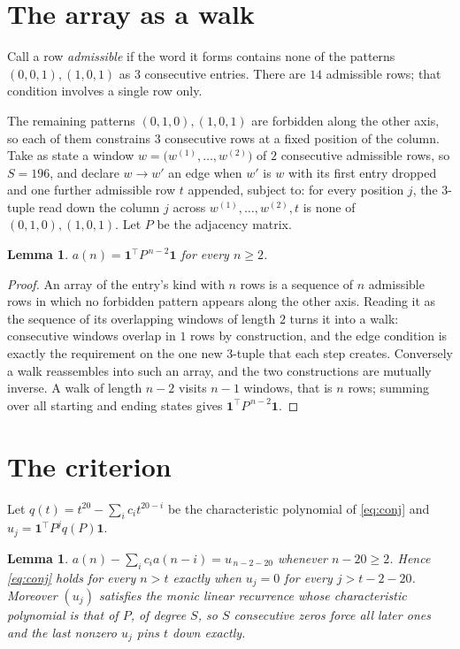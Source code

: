 \documentclass[11pt,a4paper]{article}
\theoremstyle{plain}
\newtheorem{lemma}[theorem]{Lemma}
\theoremstyle{definition}
\begin{document}
\section{The array as a walk}

Call a row \emph{admissible} if the word it forms contains none of the patterns
$(0,0,1), (1,0,1)$ as $3$ consecutive entries. There are $14$ admissible rows; that condition
involves a single row only.

The remaining patterns $(0,1,0), (1,0,1)$ are forbidden along the other axis, so each of them
constrains $3$ consecutive rows at a fixed position of the column. Take as state a
window $w=\bigl(w^{(1)},\dots,w^{(2)}\bigr)$ of $2$ consecutive admissible
rows, so $S=196$, and declare $w\to w'$ an edge when $w'$ is $w$ with its first entry
dropped and one further admissible row $t$ appended, subject to: for every position
$j$, the $3$-tuple read down the column $j$ across $w^{(1)},\dots,w^{(2)},t$
is none of $(0,1,0), (1,0,1)$. Let $P$ be the adjacency matrix.

\begin{lemma}\label{lem:walk}
$a(n)=\mathbf{1}^{\!\top}P^{\,n-2}\mathbf{1}$ for every $n\ge2$.
\end{lemma}

\begin{proof}
An array of the entry's kind with $n$ rows is a sequence of $n$ admissible rows in
which no forbidden pattern appears along the other axis. Reading it as the sequence of its
overlapping windows of length $2$ turns it into a walk: consecutive windows overlap in
$1$ rows by construction, and the edge condition is exactly the requirement on the one
new $3$-tuple that each step creates. Conversely a walk reassembles into such an array,
and the two constructions are mutually inverse. A walk of length $n-2$ visits $n-1$
windows, that is $n$ rows; summing over all starting and ending states gives
$\mathbf{1}^{\!\top}P^{\,n-2}\mathbf{1}$.
\end{proof}

\section{The criterion}

Let $q(t)=t^{20}-\sum_i c_i t^{20-i}$ be the characteristic polynomial of
\eqref{eq:conj} and $u_j=\mathbf{1}^{\!\top}P^{j}q(P)\mathbf{1}$.

\begin{lemma}\label{lem:crit}
$a(n)-\sum_i c_i a(n-i)=u_{\,n-2-20}$ whenever $n-20\ge2$. Hence
\eqref{eq:conj} holds for every $n>t$ exactly when $u_j=0$ for every
$j>t-2-20$. Moreover $(u_j)$ satisfies the monic linear recurrence whose
characteristic polynomial is that of $P$, of degree $S$, so $S$ consecutive zeros force all
later ones and the last nonzero $u_j$ pins $t$ down exactly.
\end{lemma}
\end{document}
